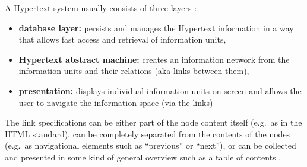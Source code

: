 A Hypertext system usually consists of three layers \citep[pg. 301-302]{borghoff2000computer}: \@

\begin{itemize}
  \item \textbf{database layer:} persists and manages the Hypertext information in a way that allows fast access and retrieval of information units,
  \item \textbf{Hypertext abstract machine:} creates an information network from the information units and their relations (aka links between them),
  \item \textbf{presentation:} displays individual information units on screen and allows the user to navigate the information space (via the links)
\end{itemize}


The link specifications can be either part of the node content itself (e.g.\ as in the \gls{HTML} standard), can be completely separated from the contents of the nodes (e.g.\ as navigational elements such as ``previous'' or ``next''), or can be collected and presented in some kind of general overview such as a table of contents \citep[pg. 304-306]{borghoff2000computer}.


